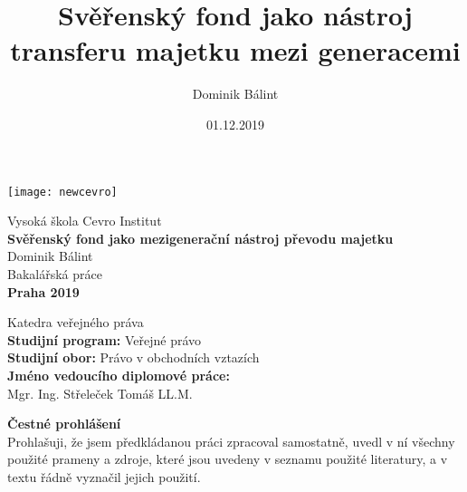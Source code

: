 \documentclass{article}
\begin{document}
\title{Svěřenský fond jako nástroj transferu majetku mezi generacemi}
\author{Dominik Bálint}
\date{01.12.2019}

  \thispagestyle{empty}
  \begin{center}
  \texttt{[image: newcevro]} \\
  \end{center}
  \vspace{15mm}
  \begin{center}
  {\Large Vysoká škola Cevro Institut} \\
  \vspace{15mm}
  {\Large \textbf{Svěřenský fond jako mezigenerační nástroj převodu majetku}} \\
  \vspace{15mm}
  {\Large Dominik Bálint} \\
  \vspace{15mm}
  {\Large Bakalářská práce} \\
  \vspace{49mm}
  {\Large \textbf{Praha 2019}} \\
  \end{center}
  
\newpage
  \thispagestyle{empty}
  \maketitle
  \begin{center}
  {\Large Katedra veřejného práva} \\	
  \vspace{15mm}
  {\Large \textbf{Studijní program:} Veřejné právo} \\
  {\Large \textbf{Studijní obor:} Právo v obchodních vztazích} \\
  {\Large \textbf{Jméno vedoucího diplomové práce:} } \\
  {\Large Mgr. Ing.  Střeleček  Tomáš LL.M.} \\
  \end{center}
  
\newpage
  \thispagestyle{empty}
  \vspace*{\fill}

\noindent \textbf{Čestné prohlášení} \\

Prohlašuji, že jsem předkládanou práci zpracoval samostatně, uvedl
v ní všechny použité prameny a zdroje, které jsou uvedeny v seznamu použité
literatury, a v textu řádně vyznačil jejich použití. \\
\end{document}
